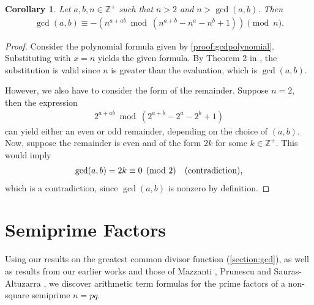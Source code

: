 \documentclass[11pt,reqno]{article}
\theoremstyle{plain}
\newtheorem{corollary}[theorem]{Corollary}
\theoremstyle{definition}
\newcommand{\Z}{\mathbb{Z}}
\begin{document}
\begin{corollary} \label{proof:gcdmodmodintegerbase}
Let $a,b,n \in \Z^+$ such that $n > 2$ and $n > \gcd(a,b)$. Then
\begin{align*}
\gcd(a,b) \equiv -\left( n^{a+ab} \bmod(n^{a+b}-n^a-n^b+1) \right) \pmod n.
\end{align*}
\end{corollary}
\begin{proof}
Consider the polynomial formula given by \cref{proof:gcdpolynomial}. Substituting with $x = n$ yields the given formula. By Theorem 2 in  \cite{shunia2024polynomial}, the substitution is valid since $n$ is greater than the evaluation, which is $\gcd(a,b)$.

However, we also have to consider the form of the remainder. Suppose $n = 2$, then the expression
\begin{align*}
2^{a+ab} \bmod(2^{a+b}-2^a-2^b+1)
\end{align*}
can yield either an even or odd remainder, depending on the choice of $(a,b)$. Now, suppose the remainder is even and of the form $2k$ for some $k \in \mathbb{Z}^+$. This would imply 
\begin{align*}
\gcd(a,b) = 2k \equiv 0 \pmod 2 \quad \textup{(contradiction)} ,
\end{align*}
which is a contradiction, since $\gcd(a,b)$ is nonzero by definition.
\end{proof}

\section{Semiprime Factors} \label{section:semiprimes}
Using our results on the greatest common divisor function (\cref{section:gcd}), as well as results from our earlier works \cite{shunia2023simple,shunia2024polynomial} and those of Mazzanti \cite{mazzanti2002plainbases}, Prunescu and Sauras-Altuzarra \cite{prunescu2024factorial}, we discover arithmetic term formulas for the prime factors of a non-square semiprime $n=p q$.
\end{document}
